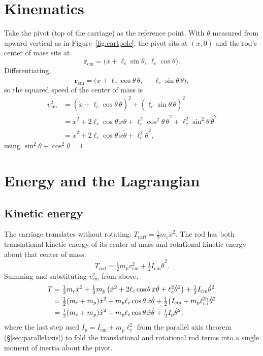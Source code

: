 \documentclass[11pt]{article}
\newcommand{\mb}[1]{\mathbf{#1}}
\begin{document}
\section{Kinematics}

Take the pivot (top of the carriage) as the reference point. With $\theta$
measured from upward vertical as in Figure~\ref{fig:cartpole}, the pivot
sits at $(x,0)$ and the rod's center of mass sits at
\[
  \mb r_{\mathrm{cm}} = \big(x + \ell_c\sin\theta,\ \ell_c\cos\theta\big).
\]
Differentiating,
\[
  \dot{\mb r}_{\mathrm{cm}} =
  \big(\dot x + \ell_c\cos\theta\,\dot\theta,\ -\ell_c\sin\theta\,\dot\theta\big),
\]
so the squared speed of the center of mass is
\begin{align*}
  v_{\mathrm{cm}}^2 &= (\dot x + \ell_c\cos\theta\,\dot\theta)^2
     + (\ell_c\sin\theta\,\dot\theta)^2 \\
  &= \dot x^2 + 2\ell_c\cos\theta\,\dot x\dot\theta
     + \ell_c^2\cos^2\theta\,\dot\theta^2 + \ell_c^2\sin^2\theta\,\dot\theta^2\\
  &= \dot x^2 + 2\ell_c\cos\theta\,\dot x\dot\theta + \ell_c^2\dot\theta^2,
\end{align*}
using $\sin^2\theta+\cos^2\theta = 1$.

\section{Energy and the Lagrangian}

\subsection{Kinetic energy}
The carriage translates without rotating: $T_{\mathrm{cart}} =
\tfrac12 m_c\dot x^2$. The rod has both translational kinetic energy of
its center of mass and rotational kinetic energy about that center of
mass:
\[
  T_{\mathrm{rod}} = \tfrac12 m_p v_{\mathrm{cm}}^2 + \tfrac12
  I_{\mathrm{cm}}\dot\theta^2.
\]
Summing and substituting $v_{\mathrm{cm}}^2$ from above,
\begin{align}
  T &= \tfrac12 m_c\dot x^2 + \tfrac12 m_p\left(\dot x^2 +
  2\ell_c\cos\theta\,\dot x\dot\theta + \ell_c^2\dot\theta^2\right)
  + \tfrac12 I_{\mathrm{cm}}\dot\theta^2 \notag\\
  &= \tfrac12 (m_c+m_p)\dot x^2 + m_p\ell_c\cos\theta\,\dot x\dot\theta
  + \tfrac12\big(I_{\mathrm{cm}} + m_p\ell_c^2\big)\dot\theta^2 \notag\\
  &= \tfrac12 (m_c+m_p)\dot x^2 + m_p\ell_c\cos\theta\,\dot x\dot\theta
  + \tfrac12 I_p\dot\theta^2, \label{eq:kinetic}
\end{align}
where the last step used $I_p = I_{\mathrm{cm}}+m_p\ell_c^2$ from the
parallel axis theorem (\S\ref{sec:parallelaxis}) to fold the translational
and rotational rod terms into a single moment of inertia about the pivot.
\end{document}
